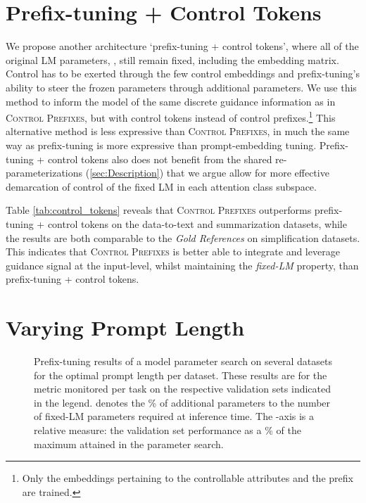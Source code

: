 \documentclass[11pt]{article}
\newcommand{\control}{\textsc{Control Prefixes}\xspace}
\newcommand{\bartl}{BART}
\begin{document}
\section{Prefix-tuning + Control Tokens}
\label{app:control_tokens}

We propose another architecture \enquote*{prefix-tuning + control tokens}, where all of the original LM parameters, , still remain fixed, including the embedding matrix. Control has to be exerted through the few control embeddings and prefix-tuning's ability to steer the frozen  parameters through  additional parameters.
We use this method to inform the model of the same discrete guidance information as in \control, but with control tokens instead of control prefixes.\footnote{Only the embeddings pertaining to the controllable attributes and the prefix are trained.} This alternative method is less expressive than \control, in much the same way as prefix-tuning is more expressive than prompt-embedding tuning. Prefix-tuning + control tokens also does not benefit from the shared re-parameterizations (\cref{sec:Description}) that we argue allow for more effective demarcation of control of the fixed LM in each attention class subspace. 

Table \ref{tab:control_tokens} reveals that \control outperforms prefix-tuning + control tokens on the data-to-text and summarization datasets, while the results are both comparable to the \emph{Gold References} on simplification datasets. This indicates that \control is better able to integrate and leverage guidance signal at the input-level, whilst maintaining the \emph{fixed-LM} property, than prefix-tuning + control tokens. 


\section{Varying Prompt Length}
\label{app:prompt_length}


\begin{figure}[h]
    \centering
    \subfloat[\centering \bartl ]{\texttt{[image: Figures/BART\_prompt.pdf]} }\qquad
    \qquad

 
    \caption{Prefix-tuning results of a model parameter search on several datasets for the optimal prompt length per dataset.  These results are for the metric monitored per task on the respective validation sets indicated in the legend.  denotes the \% of additional parameters to the number of fixed-LM parameters required at inference time. The -axis is a relative measure: the validation set performance as a \% of the maximum attained in the parameter search.} 
    \label{fig:prefix_len_proxy}\end{figure}
\end{document}
